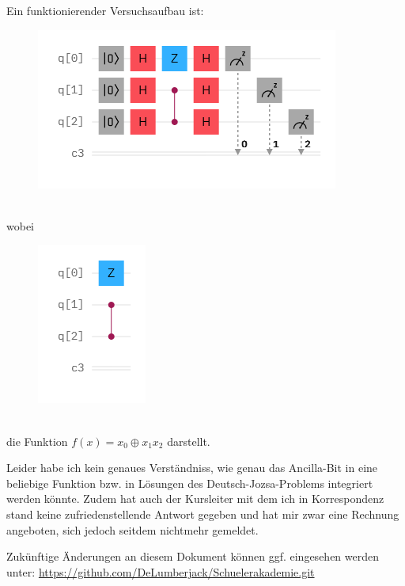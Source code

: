 \documentclass[10pt,aps,prb,twocolumn, nofootinbib]{revtex4-2}
\begin{document}
Ein funktionierender Versuchsaufbau ist:
\begin{figure}[h]
    \includegraphics[scale=0.5]{Functioning}
\end{figure}
\\wobei
\begin{figure}[h]
    \includegraphics[scale=0.5]{Function}
\end{figure}
\\die Funktion $f(x)=x_0 \oplus x_1 x_2$ darstellt.

Leider habe ich kein genaues Verst\"andniss, wie genau das Ancilla-Bit in eine beliebige Funktion bzw.
in L\"osungen des Deutsch-Jozsa-Problems integriert werden k\"onnte. Zudem hat auch der Kursleiter mit
dem ich in Korrespondenz stand keine zufriedenstellende Antwort gegeben und hat mir zwar eine Rechnung
angeboten, sich jedoch seitdem nichtmehr gemeldet.

Zuk\"unftige \"Anderungen an diesem Dokument k\"onnen ggf. eingesehen werden unter:
\url{https://github.com/DeLumberjack/Schuelerakademie.git}

\newpage


\end{document}
